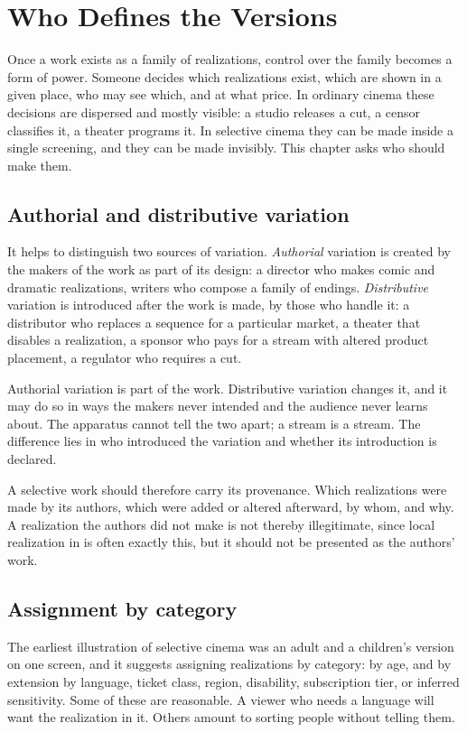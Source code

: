 \chapter{Who Defines the Versions}\label{ch:versions}

Once a work exists as a family of realizations, control over the family becomes a form of power. Someone decides which realizations exist, which are shown in a given place, who may see which, and at what price. In ordinary cinema these decisions are dispersed and mostly visible: a studio releases a cut, a censor classifies it, a theater programs it. In selective cinema they can be made inside a single screening, and they can be made invisibly. This chapter asks who should make them.

\section{Authorial and distributive variation}

It helps to distinguish two sources of variation. \emph{Authorial} variation is created by the makers of the work as part of its design: a director who makes comic and dramatic realizations, writers who compose a family of endings. \emph{Distributive} variation is introduced after the work is made, by those who handle it: a distributor who replaces a sequence for a particular market, a theater that disables a realization, a sponsor who pays for a stream with altered product placement, a regulator who requires a cut.

Authorial variation is part of the work. Distributive variation changes it, and it may do so in ways the makers never intended and the audience never learns about. The apparatus cannot tell the two apart; a stream is a stream. The difference lies in who introduced the variation and whether its introduction is declared.

A selective work should therefore carry its provenance. Which realizations were made by its authors, which were added or altered afterward, by whom, and why. A realization the authors did not make is not thereby illegitimate, since local realization in  is often exactly this, but it should not be presented as the authors' work.

\section{Assignment by category}

The earliest illustration of selective cinema was an adult and a children's version on one screen, and it suggests assigning realizations by category: by age, and by extension by language, ticket class, region, disability, subscription tier, or inferred sensitivity. Some of these are reasonable. A viewer who needs a language will want the realization in it. Others amount to sorting people without telling them.

